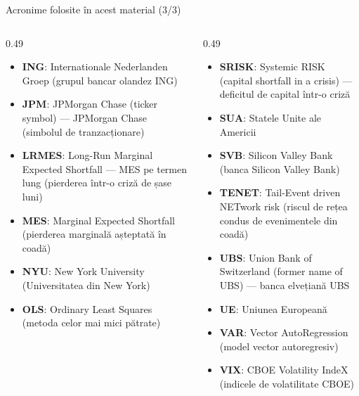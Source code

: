 \begin{frame}{Acronime folosite în acest material (3/3)}
\begin{columns}[T]
\begin{column}{0.49\textwidth}
\begin{itemize}\setlength{\itemsep}{0pt}
    \item \textbf{ING}: Internationale Nederlanden Groep (grupul bancar olandez ING)
    \item \textbf{JPM}: JPMorgan Chase (ticker symbol) — JPMorgan Chase (simbolul de tranzacționare)
    \item \textbf{LRMES}: Long-Run Marginal Expected Shortfall — MES pe termen lung (pierderea într-o criză de șase luni)
    \item \textbf{MES}: Marginal Expected Shortfall (pierderea marginală așteptată în coadă)
    \item \textbf{NYU}: New York University (Universitatea din New York)
    \item \textbf{OLS}: Ordinary Least Squares (metoda celor mai mici pătrate)
\end{itemize}
\end{column}
\begin{column}{0.49\textwidth}
\begin{itemize}\setlength{\itemsep}{0pt}
    \item \textbf{SRISK}: Systemic RISK (capital shortfall in a crisis) — deficitul de capital într-o criză
    \item \textbf{SUA}: Statele Unite ale Americii
    \item \textbf{SVB}: Silicon Valley Bank (banca Silicon Valley Bank)
    \item \textbf{TENET}: Tail-Event driven NETwork risk (riscul de rețea condus de evenimentele din coadă)
    \item \textbf{UBS}: Union Bank of Switzerland (former name of UBS) — banca elvețiană UBS
    \item \textbf{UE}: Uniunea Europeană
    \item \textbf{VAR}: Vector AutoRegression (model vector autoregresiv)
    \item \textbf{VIX}: CBOE Volatility IndeX (indicele de volatilitate CBOE)
\end{itemize}
\end{column}
\end{columns}
\end{frame}

